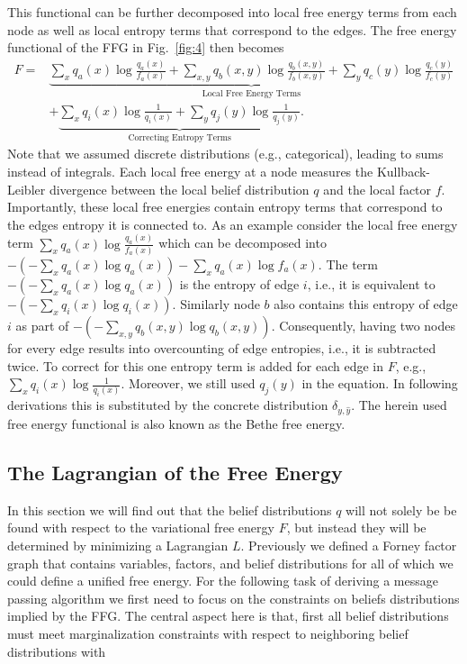 This functional can be further decomposed into local free energy terms from each node as well as local entropy terms that correspond to the edges. The free energy functional of the FFG in Fig.~\ref{fig:4} then becomes
\begin{equation}
    \begin{split}
        F = & \underbrace{\sum_x q_a(x) \log \frac{q_a(x)}{f_a(x)} + \sum_{x,y} q_b(x,y) \log \frac{q_b(x,y)}{f_b(x,y)} + \sum_y q_c(y) \log \frac{q_c(y)}{f_c(y)}}_{\text{Local Free Energy Terms}} \\
            & + \underbrace{\sum_x q_i(x) \log \frac{1}{q_i(x)} + \sum_y q_j(y) \log \frac{1}{q_j(y)}}_{\text{Correcting Entropy Terms}}.
    \end{split}
\end{equation}
Note that we assumed discrete distributions (e.g., categorical), leading to sums instead of integrals.
Each local free energy at a node measures the Kullback-Leibler divergence between the local belief distribution \(q\) and the local factor \(f\). Importantly, these local free energies contain entropy terms that correspond to the edges entropy it is connected to. As an example consider the local free energy term \(\sum_x q_a(x) \log \frac{q_a(x)}{f_a(x)}\) which can be decomposed into \(- (-\sum_x q_a(x) \log q_a(x)) - \sum_x q_a(x) \log f_a(x)\). The term \(- (-\sum_x q_a(x) \log q_a(x))\) is the entropy of edge \(i\), i.e., it is equivalent to \(- (-\sum_x q_i(x) \log q_i(x))\). Similarly node \(b\) also contains this entropy of edge \(i\) as part of \(- (-\sum_{x,y} q_b(x,y) \log q_b(x,y))\). Consequently, having two nodes for every edge results into overcounting of edge entropies, i.e., it is subtracted twice. To correct for this one entropy term is added for each edge in \(F\), e.g., \(\sum_x q_i(x) \log \frac{1}{q_i(x)}\). Moreover, we still used \(q_j(y)\) in the equation. In following derivations this is substituted by the concrete distribution \(\delta_{y,\hat{y}}\). The herein used free energy functional is also known as the Bethe free energy.

\subsection{The Lagrangian of the Free Energy}
In this section we will find out that the belief distributions \(q\) will not solely be be found with respect to the variational free energy \(F\), but instead they will be determined by minimizing a Lagrangian \(L\).
Previously we defined a Forney factor graph that contains variables, factors, and belief distributions for all of which we could define a unified free energy. For the following task of deriving a message passing algorithm we first need to focus on the constraints on beliefs distributions implied by the FFG. The central aspect here is that, first all belief distributions must meet marginalization constraints with respect to neighboring belief distributions with

